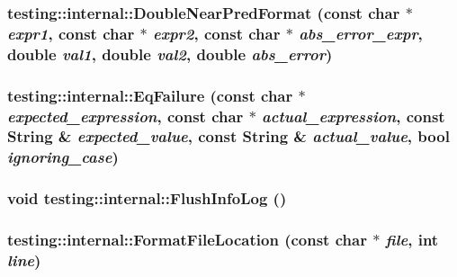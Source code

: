 \subsubsection{ testing::internal::DoubleNearPredFormat (const char $\ast$ {\em expr1}, const char $\ast$ {\em expr2}, const char $\ast$ {\em abs\_\-error\_\-expr}, double {\em val1}, double {\em val2}, double {\em abs\_\-error})}\label{namespacetesting_1_1internal_2ffeb072172886ea1185c03dda4b0d76}


\subsubsection{ testing::internal::EqFailure (const char $\ast$ {\em expected\_\-expression}, const char $\ast$ {\em actual\_\-expression}, const String \& {\em expected\_\-value}, const String \& {\em actual\_\-value}, bool {\em ignoring\_\-case})}\label{namespacetesting_1_1internal_edef6e77f267b3a60fabda1428c6742c}


\subsubsection{\setlength{\rightskip}{0pt plus 5cm}void testing::internal::FlushInfoLog ()\hspace{0.3cm}{\tt  [inline]}}\label{namespacetesting_1_1internal_dfed47bb3f9234ca6c3a6003b69ee602}


\subsubsection{ testing::internal::FormatFileLocation (const char $\ast$ {\em file}, int {\em line})\hspace{0.3cm}{\tt  [inline]}}\label{namespacetesting_1_1internal_67e13a54c56c7495bac6f91447c84aa7}


